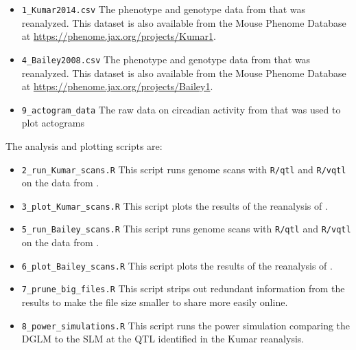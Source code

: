     \begin{itemize}
        \item \texttt{1\_Kumar2014.csv} The phenotype and genotype data from \citet{Kumar2013} that was reanalyzed.
            This dataset is also available from the Mouse Phenome Database \citep{Bogue2015} at \url{https://phenome.jax.org/projects/Kumar1}.
        \item \texttt{4\_Bailey2008.csv} The phenotype and genotype data from \citet{Bailey2008} that was reanalyzed.
            This dataset is also available from the Mouse Phenome Database at \url{https://phenome.jax.org/projects/Bailey1}.
        \item \texttt{9\_actogram\_data} The raw data on circadian activity from \citet{Kumar2013} that was used to plot actograms
    \end{itemize}
    The analysis and plotting scripts are:
    \begin{itemize}
        \item \texttt{2\_run\_Kumar\_scans.R} This script runs genome scans with \texttt{R/qtl} and \texttt{R/vqtl} on the data from \citet{Kumar2013}.
        \item \texttt{3\_plot\_Kumar\_scans.R} This script plots the results of the reanalysis of \citet{Kumar2013}.
        \item \texttt{5\_run\_Bailey\_scans.R} This script runs genome scans with \texttt{R/qtl} and \texttt{R/vqtl} on the data from \citet{Bailey2008}.
        \item \texttt{6\_plot\_Bailey\_scans.R} This script plots the results of the reanalysis of \citet{Bailey2008}.
        \item \texttt{7\_prune\_big\_files.R} This script strips out redundant information from the results to make the file size smaller to share more easily online.
        \item \texttt{8\_power\_simulations.R} This script runs the power simulation comparing the DGLM to the SLM at the QTL identified in the Kumar reanalysis.
    \end{itemize}

